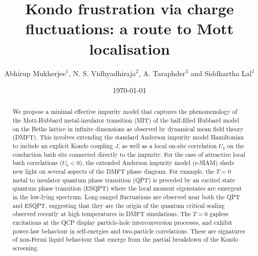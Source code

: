 \documentclass{iopart}
\begin{document}
\title{Kondo frustration via charge fluctuations: a route to Mott localisation}

\author{Abhirup Mukherjee$^1$, N. S. Vidhyadhiraja$^2$, A. Taraphder$^3$ and Siddhartha Lal$^1$}

\address{$^1$Department of Physical Sciences, Indian Institute of Science Education and Research-Kolkata, W.B. 741246, India}

\address{$^2$Theoretical Sciences Unit, Jawaharlal Nehru Center for Advanced Scientific Research, Jakkur, Bengaluru 560064, India}

\address{$^3$Department of Physics, Indian Institute of Technology Kharagpur, Kharagpur 721302, India}

\date{\today}

\begin{abstract}
We propose a minimal effective impurity model that captures the phenomenology of the Mott-Hubbard metal-insulator transition (MIT) of the half-filled Hubbard model on the Bethe lattice in infinite dimensions as observed by dynamical mean field theory (DMFT). This involves extending the standard Anderson impurity model Hamiltonian to include an explicit Kondo coupling $J$, as well as a local on-site correlation \(U_b\) on the conduction bath site connected directly to the impurity. For the case of attractive local bath correlations ($U_{b}<0$), the extended Anderson impurity model (e-SIAM) sheds new light on several aspects of the DMFT phase diagram. For example, the $T=0$ metal to insulator quantum phase transition (QPT) is preceded by an excited state quantum phase transition (ESQPT) where the local moment eigenstates are emergent in the low-lying spectrum. Long-ranged fluctuations are observed near both the QPT and ESQPT, suggesting that they are the origin of the quantum critical scaling observed recently at high temperatures in DMFT simulations. The \(T=0\) gapless excitations at the QCP display particle-hole interconversion processes, and exhibit power-law behaviour in self-energies and two-particle correlations. These are signatures of non-Fermi liquid behaviour that emerge from the partial breakdown of the Kondo screening.
\end{abstract}

\maketitle
\end{document}
